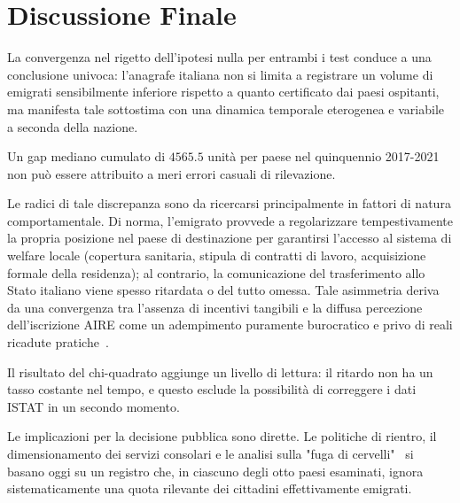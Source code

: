 \section{Discussione Finale}\label{sec:discussione_finale}
La convergenza nel rigetto dell'ipotesi nulla per entrambi i test conduce a una conclusione univoca: l'anagrafe italiana non si limita a registrare un volume di emigrati sensibilmente inferiore rispetto a quanto certificato dai paesi ospitanti, ma manifesta tale sottostima con una dinamica temporale eterogenea e variabile a seconda della nazione. 

Un gap mediano cumulato di $4565.5$ unità per paese nel quinquennio 2017-2021
non può essere attribuito a meri errori casuali di rilevazione.

Le radici di tale discrepanza sono da ricercarsi principalmente in fattori di natura comportamentale. 
Di norma, l'emigrato provvede a regolarizzare tempestivamente la propria posizione nel paese di destinazione per garantirsi l'accesso al sistema di welfare locale (copertura sanitaria, stipula di contratti di lavoro, acquisizione formale della residenza); al contrario, la comunicazione del trasferimento allo Stato italiano viene spesso ritardata o del tutto omessa. 
Tale asimmetria deriva da una convergenza tra l'assenza di incentivi tangibili e la diffusa percezione dell'iscrizione AIRE come un adempimento puramente burocratico e privo di reali ricadute pratiche~\cite{coniglio_et_al2020}. 

Il risultato del chi-quadrato aggiunge un livello di lettura: il ritardo non ha un
tasso costante nel tempo, e questo esclude la possibilità di correggere
i dati ISTAT in un secondo momento.

Le implicazioni per la decisione pubblica sono dirette. Le politiche
di rientro, il dimensionamento dei servizi consolari e le analisi
sulla "fuga di cervelli"~\cite{almalaurea2022} si basano oggi su un
registro che, in ciascuno degli otto paesi esaminati, ignora
sistematicamente una quota rilevante dei cittadini effettivamente
emigrati.